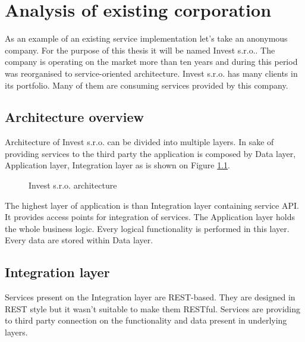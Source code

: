 \chapter{Analysis of existing corporation}

As an example of an existing service implementation let's take an anonymous company. For the purpose of this thesis it will be named Invest s.r.o.. The company is operating on the market more than ten years and during this period was reorganised to service-oriented architecture. Invest s.r.o. has many clients in its portfolio. Many of them are consuming services provided by this company.

\section{Architecture overview}
Architecture of Invest s.r.o. can be divided into multiple layers. In sake of providing services to the third party the application is composed by Data layer, Application layer, Integration layer as is shown on Figure \ref{fig:invest-architecture}.

\begin{figure}[htp] 
\caption{Invest s.r.o. architecture}
\label{fig:invest-architecture}
\end{figure} 

The highest layer of application is than Integration layer containing service API. It provides access points for integration of services. The Application layer holds the whole business logic. Every logical functionality is performed in this layer. Every data are stored within Data layer.

\section{Integration layer}
Services present on the Integration layer are REST-based. They are designed in REST style but it wasn't suitable to make them RESTful. Services are providing to third party connection on the functionality and data present in underlying layers.

